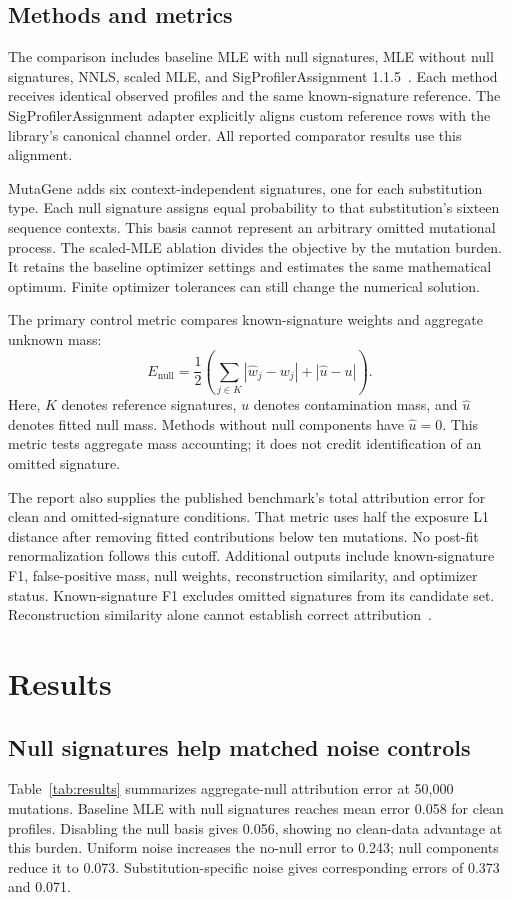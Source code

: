 \documentclass[11pt]{article}
\begin{document}
\subsection{Methods and metrics}
The comparison includes baseline MLE with null signatures, MLE without null signatures, NNLS, scaled MLE, and SigProfilerAssignment 1.1.5~\cite{spa}.
Each method receives identical observed profiles and the same known-signature reference.
The SigProfilerAssignment adapter explicitly aligns custom reference rows with the library's canonical channel order.
All reported comparator results use this alignment.

MutaGene adds six context-independent signatures, one for each substitution type.
Each null signature assigns equal probability to that substitution's sixteen sequence contexts.
This basis cannot represent an arbitrary omitted mutational process.
The scaled-MLE ablation divides the objective by the mutation burden.
It retains the baseline optimizer settings and estimates the same mathematical optimum.
Finite optimizer tolerances can still change the numerical solution.

The primary control metric compares known-signature weights and aggregate unknown mass:
\[
E_{\mathrm{null}}=\frac{1}{2}\left(\sum_{j\in K}|\hat w_j-w_j|+|\hat u-u|\right).
\]
Here, $K$ denotes reference signatures, $u$ denotes contamination mass, and $\hat u$ denotes fitted null mass.
Methods without null components have $\hat u=0$.
This metric tests aggregate mass accounting; it does not credit identification of an omitted signature.

The report also supplies the published benchmark's total attribution error for clean and omitted-signature conditions.
That metric uses half the exposure L1 distance after removing fitted contributions below ten mutations.
No post-fit renormalization follows this cutoff.
Additional outputs include known-signature F1, false-positive mass, null weights, reconstruction similarity, and optimizer status.
Known-signature F1 excludes omitted signatures from its candidate set.
Reconstruction similarity alone cannot establish correct attribution~\cite{benchmark2025}.

\section{Results}
\subsection{Null signatures help matched noise controls}
Table~\ref{tab:results} summarizes aggregate-null attribution error at 50,000 mutations.
Baseline MLE with null signatures reaches mean error 0.058 for clean profiles.
Disabling the null basis gives 0.056, showing no clean-data advantage at this burden.
Uniform noise increases the no-null error to 0.243; null components reduce it to 0.073.
Substitution-specific noise gives corresponding errors of 0.373 and 0.071.
\end{document}
